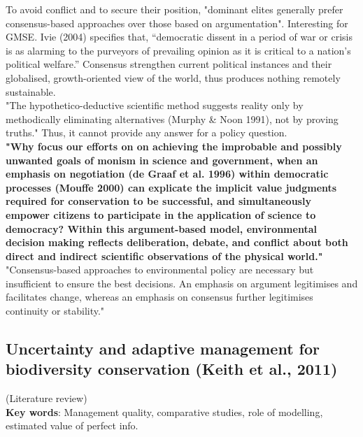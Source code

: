 \documentclass[12pt]{article}
\begin{document}
To avoid conflict and to secure their position, "dominant elites generally prefer consensus-based approaches over those based on argumentation". Interesting for GMSE.
Ivie (2004) specifies that, “democratic dissent in a period of war or crisis is as alarming to the purveyors of prevailing opinion as it is critical to a nation’s political welfare.”
Consensus strengthen current political instances and their globalised, growth-oriented view of the world, thus produces nothing remotely sustainable.\\
"The hypothetico-deductive scientific method suggests reality only by methodically eliminating alternatives (Murphy \& Noon 1991), not by proving truths." Thus, it cannot provide any answer for a policy question.\\
\textbf{"Why focus our efforts on on achieving the improbable and possibly unwanted goals
of monism in science and government, when an emphasis  on  negotiation  (de  Graaf  et  al.  1996) within democratic processes (Mouffe 2000) can explicate the implicit value judgments required for conservation to be successful, and simultaneously empower citizens to participate in the application of science to democracy? Within this argument-based model, environmental decision making reflects deliberation, debate, and conflict about both direct and indirect scientific observations of the physical world."}\\
"Consensus-based approaches to environmental  policy  are  necessary  but  insufficient  to  ensure the best decisions. An emphasis on argument legitimises and facilitates change, whereas an emphasis on consensus further legitimises continuity or stability."

\subsection{Uncertainty and adaptive management for biodiversity conservation (Keith et al., 2011)}

(Literature review)\\
\textbf{Key words}: Management quality, comparative studies, role of modelling, estimated value of perfect info.\\
\end{document}
